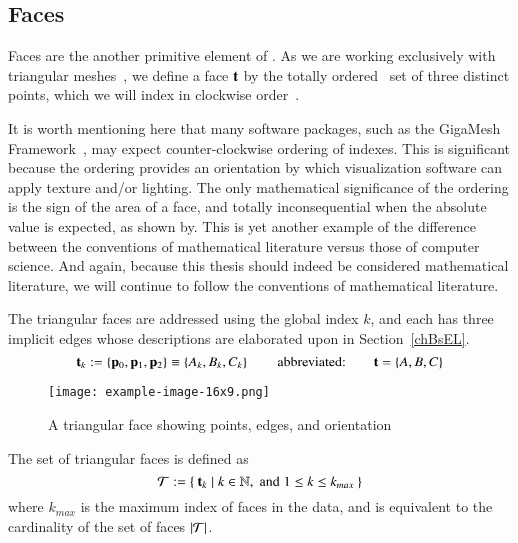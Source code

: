 \subsection{Faces}
\label{ch2s3ssF}
Faces are the another primitive element of \tdd{}. As we are working exclusively with triangular meshes~\cite[p.~26]{Mara12}, we define a face $\mathbf{t}$ by the totally ordered~\cite{Weisstein19a} set of three distinct points, which we will index in clockwise order~\cite[p.~4]{Mara17}.

It is worth mentioning here that many software packages, such as the GigaMesh Framework~\cite[p.~89]{Mara12}, may expect counter-clockwise ordering of indexes.  This is significant because the ordering provides an orientation by which visualization software can apply texture and/or lighting. The only mathematical significance of the ordering is the sign of the area of a face, and totally inconsequential when the absolute value is expected, as shown by\cite[p.~2]{Braden86}. This is yet another example of the difference between the conventions of mathematical literature versus those of computer science. And again, because this thesis should indeed be considered mathematical literature, we will continue to follow the conventions of mathematical literature.

The triangular faces are addressed using the global index $k$, and each has three implicit edges whose descriptions are elaborated upon in Section~\ref{chBsEL}.
\begin{equation}
	\mathbf{t}_k := \left \{\mathbf{p}_0, \mathbf{p}_1, \mathbf{p}_2\right \} \equiv \left \{A_k, B_k, C_k\right \} \hspace{20pt}\text{abbreviated:}\hspace{20pt} \mathbf{t} = \left \{A, B, C\right \}
	\label{eq:defineSetOfFaces}
\end{equation}%
%
%
\begin{figure}[]
\ffigbox
	{\texttt{[image: example-image-16x9.png]}}
	{\caption[A Triangular Face]{A triangular face showing points, edges, and orientation}\label{fig:facesOfAMesh}}
\end{figure}
%
The set of triangular faces is defined as
\begin{equation}
	\mathcal{T} := \left \{\:\mathbf{t}_k \mid k \in \mathbb{N}, \;\text{and}\; 1\leq k \leq k_{max}\:\right \}
	\label{eq:defineSetOfFaces}
\end{equation}
where $k_{max}$ is the maximum index of faces in the data, and is equivalent to the cardinality of the set of faces $|\mathcal{T}|$.%
%

